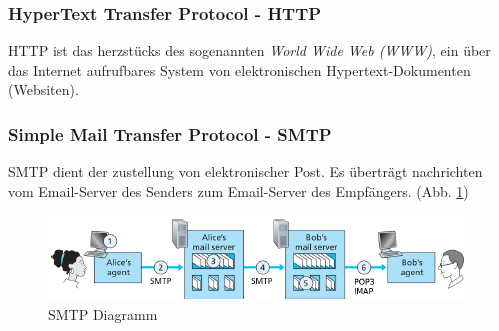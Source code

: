 \documentclass[12pt]{report}
\begin{document}
\subsubsection{HyperText Transfer Protocol - HTTP}
\begin{defbox}
  HTTP ist das herzstücks des sogenannten \textit{World Wide Web (WWW)}, ein über 
  das Internet aufrufbares System von elektronischen Hypertext-Dokumenten (Websiten).
\end{defbox}

\subsubsection{Simple Mail Transfer Protocol - SMTP}
\begin{defbox}
  SMTP dient der zustellung von elektronischer Post. 
  Es überträgt nachrichten vom Email-Server des Senders zum Email-Server des Empfängers. (Abb. \ref{fig:smtp})
\end{defbox}

\begin{figure}[H]
  \caption{SMTP Diagramm}
  \label{fig:smtp}
  \centering
  \includegraphics{smtp}
\end{figure}
\end{document}
